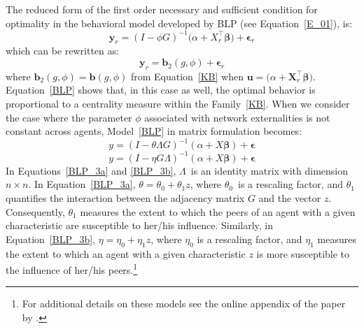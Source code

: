 \documentclass[nojss]{jss}
\begin{document}
The reduced form of the first order necessary and sufficient condition for
optimality in the behavioral model developed by BLP (see
Equation~\ref{E_01}), is:
%
\begin{equation*}
\mathbf{y}_{r}=\left(I-\phi G\right) ^{-1}(\alpha
+X_{r}^\top\mathbf{\beta )}+\mathbf{\epsilon }_{r}
\label{BLP0}
\end{equation*}
%
which can be rewritten as:
%
\begin{equation}
\mathbf{y}_{r}=\boldsymbol{b}_{2}\left( g,\phi \right)+\mathbf{\epsilon}_{r}
\label{BLP}
\end{equation}
%
where $\boldsymbol{b}_{2}\left( g,\phi \right) =\boldsymbol{b}\left( g,\phi
\right) $ from Equation~\ref{KB} when $\boldsymbol{u}=(\alpha
+\boldsymbol{X}_{r}^\top\mathbf{\beta)}$.  Equation~\ref{BLP} shows that, in
this case as well, the optimal behavior is proportional to a centrality
measure within the Family~\ref{KB}.  When we consider the case where the
parameter $\phi$ associated with network externalities is not constant
across agents, Model~\ref{BLP} in matrix formulation becomes:
%
\begin{equation}
y=(I-\theta \Lambda G)^{-1}(\alpha +X\mathbf{\beta })+\mathbf{\epsilon}
\label{BLP_3a}
\end{equation}
%
\begin{equation}
y=(I-\eta G\Lambda)^{-1}(\alpha +X\mathbf{\beta })+\mathbf{\epsilon}
\label{BLP_3b}
\end{equation}
%
In Equations~\ref{BLP_3a} and \ref{BLP_3b}, $\Lambda $\ is an identity
matrix with dimension $n \times n$.  In Equation~\ref{BLP_3a}, $\theta
=\theta _{0}+\theta _{1}z$, where $\theta _{0}$\ is a rescaling factor, and
$\theta _{1}$ quantifies the interaction between the adjacency matrix $G$
and the vector $z$.  Consequently, $\theta _{1}$ measures the extent to
which the peers of an agent with a given characteristic are susceptible to
her/his influence.  Similarly, in Equation~\ref{BLP_3b}, $\eta =\eta
_{0}+\eta _{1}z$, where $\eta _{0}$ is a rescaling factor, and $\eta _{1}$
measures the extent to which an agent with a given characteristic $z$ is
more susceptible to the influence of her/his peers.\footnote{For additional
details on these models see the online appendix of the paper by
\cite{Battaglini+Sciabolazza+Patacchini:2020}.}
\end{document}
